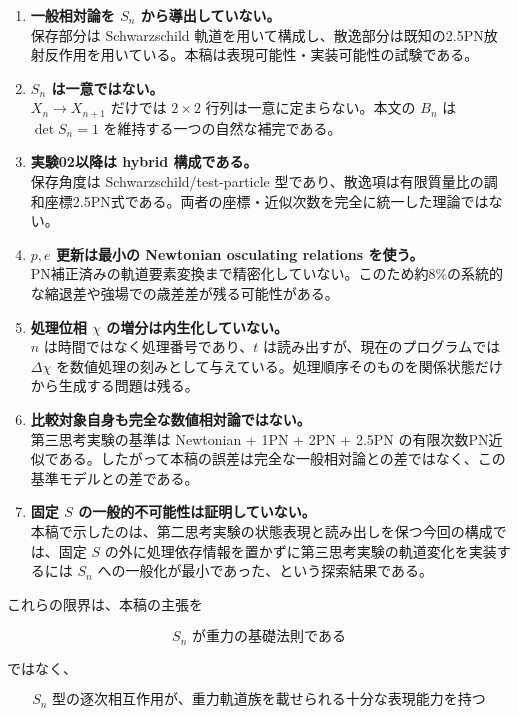 \documentclass[
  a4paper,
]{ltjsarticle}
\begin{document}
\begin{enumerate}
\def\labelenumi{\arabic{enumi}.}
\item
  \textbf{一般相対論を \(S_n\) から導出していない。}\\
  保存部分は Schwarzschild
  軌道を用いて構成し、散逸部分は既知の2.5PN放射反作用を用いている。本稿は表現可能性・実装可能性の試験である。
\item
  \textbf{\(S_n\) は一意ではない。}\\
  \(X_n\rightarrow X_{n+1}\) だけでは \(2\times2\)
  行列は一意に定まらない。本文の \(B_n\) は \(\det S_n=1\)
  を維持する一つの自然な補完である。
\item
  \textbf{実験02以降は hybrid 構成である。}\\
  保存角度は Schwarzschild/test-particle
  型であり、散逸項は有限質量比の調和座標2.5PN式である。両者の座標・近似次数を完全に統一した理論ではない。
\item
  \textbf{\(p,e\) 更新は最小の Newtonian osculating relations
  を使う。}\\
  PN補正済みの軌道要素変換まで精密化していない。このため約8\%の系統的な縮退差や強場での歳差差が残る可能性がある。
\item
  \textbf{処理位相 \(\chi\) の増分は内生化していない。}\\
  \(n\) は時間ではなく処理番号であり、\(t\)
  は読み出すが、現在のプログラムでは \(\Delta\chi\)
  を数値処理の刻みとして与えている。処理順序そのものを関係状態だけから生成する問題は残る。
\item
  \textbf{比較対象自身も完全な数値相対論ではない。}\\
  第三思考実験の基準は Newtonian + 1PN + 2PN + 2.5PN
  の有限次数PN近似である。したがって本稿の誤差は完全な一般相対論との差ではなく、この基準モデルとの差である。
\item
  \textbf{固定 \(S\) の一般的不可能性は証明していない。}\\
  本稿で示したのは、第二思考実験の状態表現と読み出しを保つ今回の構成では、固定
  \(S\) の外に処理依存情報を置かずに第三思考実験の軌道変化を実装するには
  \(S_n\) への一般化が最小であった、という探索結果である。
\end{enumerate}

これらの限界は、本稿の主張を

\[
\boxed{
S_n\text{ が重力の基礎法則である}
}
\]

ではなく、

\[
\boxed{
S_n\text{ 型の逐次相互作用が、重力軌道族を載せられる十分な表現能力を持つ}
}
\]
\end{document}
